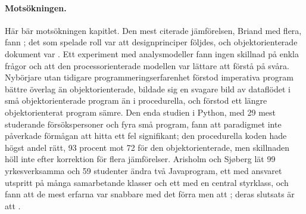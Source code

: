 \paragraph{Motsökningen.}  Här bär motsökningen kapitlet.  Den mest
citerade jämförelsen, Briand med flera, fann
; det som spelade roll var att
designprinciper följdes, och objektorienterade dokument var
.  Ett experiment med analysmodeller fann ingen skillnad på
enkla frågor och att den processorienterade modellen var lättare att
förstå på svåra\autocite{Agarwal1999}.  Nybörjare utan tidigare
programmeringserfarenhet förstod imperativa program bättre överlag än
objektorienterade\autocite{RamalingamWiedenbeck1997}, bildade sig en
svagare bild av dataflödet i små objektorienterade program än i
procedurella\autocite{WiedenbeckRamalingam1999}, och förstod ett längre
objektorienterat program sämre\autocite{Wiedenbeck1999}.  Den enda
studien i Python, med 29 mest studerande försökspersoner och fyra små
program, fann att paradigmet inte påverkade förmågan att hitta ett fel
signifikant\autocite{Flint2026Python}; den procedurella koden hade högst
andel rätt, 93 procent mot 72 för den objektorienterade, men skillnaden
höll inte efter korrektion för flera
jämförelser\autocite[avsnitt~6.4.1]{Flint2026Python}.  Arisholm och
Sjøberg lät 99 yrkesverksamma och 59 studenter ändra två Javaprogram,
ett med ansvaret utspritt på många samarbetande klasser och ett med en
central styrklass, och fann att de mest erfarna var snabbare med det
förra men att ; deras
slutsats är att .

